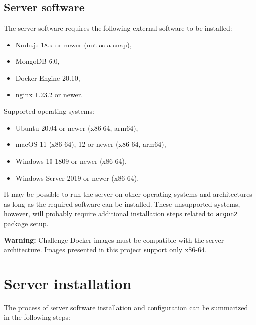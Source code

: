 \subsection{Server software}
\label{chap:server-soft}

The server software requires the following external software to be installed:

\begin{itemize}
    \item Node.js 18.x or newer (not as a \href{https://snapcraft.io/node}{snap}),
    \item MongoDB 6.0,
    \item Docker Engine 20.10,
    \item nginx 1.23.2 or newer.
\end{itemize}

Supported operating systems:

\begin{itemize}
    \item Ubuntu 20.04 or newer (x86-64, arm64),
    \item macOS 11 (x86-64), 12 or newer (x86-64, arm64),
    \item Windows 10 1809 or newer (x86-64),
    \item Windows Server 2019 or newer (x86-64).
\end{itemize}

It may be possible to run the server on other operating systems and architectures as long as the required software can be installed. These unsupported systems, however, will probably require \href{https://github.com/ranisalt/node-argon2/tree/v0.30.3#before-installing}{additional installation steps} related to \texttt{argon2} package setup.

\textbf{Warning:} Challenge Docker images must be compatible with the server architecture. Images presented in this project support only x86-64.

\section{Server installation}

The process of server software installation and configuration can be summarized in the following steps:

